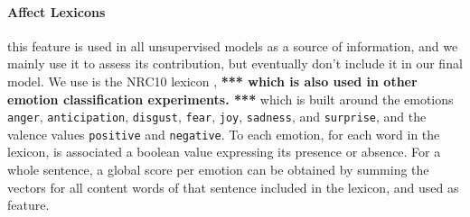 \documentclass[11pt]{article}
\newcommand{\note}[1]{\textbf{*** #1 ***}}
\begin{document}
\paragraph{Affect Lexicons} this feature is used in all unsupervised models as a source of information, and we mainly use it to assess its contribution, but eventually don't include it in our final model. We use is the NRC10 lexicon \cite{Mohammad13}, \note{which is also used in other emotion classification experiments.}
which is built around the emotions \texttt{anger}, \texttt{anticipation}, \texttt{disgust}, \texttt{fear}, \texttt{joy}, \texttt{sadness}, and \texttt{surprise}, and the valence values \texttt{positive} and \texttt{negative}. To each emotion, for each word in the lexicon, is associated a boolean value expressing its presence or absence. For a whole sentence, a global score per emotion can be obtained by summing the vectors for all content words of that sentence included in the lexicon, and used as feature.
%
\end{document}
